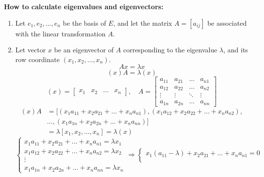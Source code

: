 \textbf{How to calculate eigenvalues and eigenvectors:}
\begin{enumerate}
    \item Let $e_1, e_2, \dots, e_n$ be the basis of $E$, and let the matrix $A = [a_{ij}]$ be associated with the linear transformation $A$.
    \item Let vector $x$ be an eigenvector of $A$ corresponding to the eigenvalue $\lambda$, and its row coordinate $(x_1, x_2, \ldots, x_n)$.
    \begin{equation*}
        A x = \lambda x
    \end{equation*}
    \begin{equation*}
        (x)A = \lambda (x)
    \end{equation*}    
    \begin{equation*}
        (x) = \begin{bmatrix}
            x_1 & x_2 & \dots & x_n
        \end{bmatrix}, 
        \quad A = \begin{bmatrix}
            a_{11} & a_{21} & \dots & a_{n1}\\
            a_{12} & a_{22} & \dots & a_{n2}\\
            \vdots & \vdots & \ddots & \vdots\\
            a_{1n} & a_{2n} & \dots & a_{nn}
        \end{bmatrix} 
    \end{equation*}
    \begin{align*}
        (x)A 
        &= [(x_1a_{11} + x_2a_{21} + \ldots + x_na_{n1}), (x_1a_{12} + x_2a_{22} + \ldots + x_na_{n2}),\\
        &\ldots, (x_1a_{1n} + x_2a_{2n} + \ldots + x_na_{nn})]\\
        &= \lambda[x_1, x_2, \ldots, x_n] = \lambda (x)
    \end{align*}
    \begin{equation*}
        \begin{cases}
            x_1a_{11}+ x_2a_{21} + \ldots + x_n a_{n1} = \lambda x_1\\
            x_1a_{12}+ x_2a_{22} + \ldots + x_n a_{n2} = \lambda x_2\\
            \vdots\\
            x_1a_{1n}+ x_2a_{2n} + \ldots + x_n a_{nn} = \lambda x_n
        \end{cases}
        \Rightarrow \begin{cases}
            x_1(a_{11} - \lambda) + x_2a_{21} + \ldots + x_na_{n1} = 0\\

\end{cases}
\end{equation*}
\end{enumerate}
